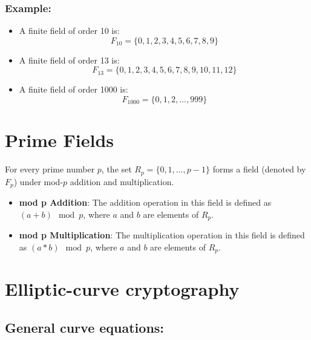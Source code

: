 \documentclass[11pt, letterpaper]{article}
\begin{document}
\subsubsection*{Example:}

\begin{itemize}
    \item A finite field of order 10 is:
    \[
    F_{10} = \{0, 1, 2, 3, 4, 5, 6, 7, 8, 9\}
    \]
    \item A finite field of order 13 is:
    \[
    F_{13} = \{0, 1, 2, 3, 4, 5, 6, 7, 8, 9, 10, 11, 12\}
    \]
    \item A finite field of order 1000 is:
    \[
    F_{1000} = \{0, 1, 2, \ldots, 999\}
    \]
\end{itemize}

\section{Prime Fields}

For every prime number \( p \), the set \( R_p = \{0, 1, \ldots, p - 1\} \) forms a field (denoted by \( F_p \)) under mod-\( p \) addition and multiplication.

\begin{itemize}
    \item \textbf{mod p Addition}: The addition operation in this field is defined as \( (a + b) \mod p \), where \( a \) and \( b \) are elements of \( R_p \).
    \item \textbf{mod p Multiplication}: The multiplication operation in this field is defined as \( (a \ast b) \mod p \), where \( a \) and \( b \) are elements of \( R_p \).
\end{itemize}

\section{Elliptic-curve cryptography}

\subsection{General curve equations:}
\end{document}
